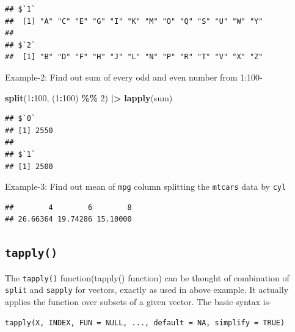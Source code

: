 \documentclass[
]{book}
\newenvironment{Shaded}{\begin{snugshade}}{\end{snugshade}}
\newcommand{\DecValTok}[1]{\textcolor[rgb]{0.00,0.00,0.81}{#1}}
\newcommand{\FunctionTok}[1]{\textcolor[rgb]{0.13,0.29,0.53}{\textbf{#1}}}
\newcommand{\NormalTok}[1]{#1}
\newcommand{\SpecialCharTok}[1]{\textcolor[rgb]{0.81,0.36,0.00}{\textbf{#1}}}
\begin{document}
\begin{verbatim}
## $`1`
##  [1] "A" "C" "E" "G" "I" "K" "M" "O" "Q" "S" "U" "W" "Y"
## 
## $`2`
##  [1] "B" "D" "F" "H" "J" "L" "N" "P" "R" "T" "V" "X" "Z"
\end{verbatim}

Example-2: Find out sum of every odd and even number from 1:100-

\begin{Shaded}
\begin{Highlighting}[]
\FunctionTok{split}\NormalTok{(}\DecValTok{1}\SpecialCharTok{:}\DecValTok{100}\NormalTok{, (}\DecValTok{1}\SpecialCharTok{:}\DecValTok{100}\NormalTok{) }\SpecialCharTok{\%\%} \DecValTok{2}\NormalTok{) }\SpecialCharTok{|\textgreater{}} \FunctionTok{lapply}\NormalTok{(sum)}
\end{Highlighting}
\end{Shaded}

\begin{verbatim}
## $`0`
## [1] 2550
## 
## $`1`
## [1] 2500
\end{verbatim}

Example-3: Find out mean of \texttt{mpg} column splitting the \texttt{mtcars} data by \texttt{cyl}

\begin{Shaded}
\end{Shaded}

\begin{verbatim}
##        4        6        8 
## 26.66364 19.74286 15.10000
\end{verbatim}

\hypertarget{tapply}{%
\subsection{\texorpdfstring{\texttt{tapply()}}{tapply()}}\label{tapply}}

The \texttt{tapply()} function\index(tapply() function) can be thought of combination of \texttt{split} and \texttt{sapply} for vectors, exactly as used in above example. It actually applies the function over subsets of a given vector. The basic syntax is-

\begin{verbatim}
tapply(X, INDEX, FUN = NULL, ..., default = NA, simplify = TRUE)
\end{verbatim}
\end{document}
